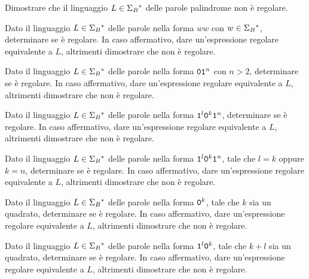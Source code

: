 \begin{Exercise}\label{exe:pump-palindromi}
	Dimostrare che il linguaggio $L\in\Sigma_{B}{}^{\ast}$ delle parole palindrome
	non è regolare.
\end{Exercise}



\begin{Exercise}\label{exe:pump-copie}
	Dato il linguaggio $L\in\Sigma_{B}{}^{\ast}$ delle parole nella forma $ww$ con $w\in\Sigma_{B}{}^{\ast}$, determinare se è
	regolare.
	In  caso affermativo, dare un'espressione regolare equivalente a $L$, altrimenti dimostrare che non è regolare.
\end{Exercise}

\begin{Exercise}\label{exe:pump-011+}
	Dato il linguaggio $L\in\Sigma_{B}{}^{\ast}$ delle parole nella forma $\mathtt{0}\mathtt{1}^{n}$ con $n > 2$, determinare se è
	regolare.
	In  caso affermativo, dare un'espressione regolare equivalente a $L$, altrimenti dimostrare che non è regolare.
\end{Exercise}

\begin{Exercise}\label{exe:pump-1l0k1n}
	Dato il linguaggio $L\in\Sigma_{B}{}^{\ast}$ delle parole nella forma $\mathtt{1}^{l}\mathtt{0}^{k}\mathtt{1}^{n}$, determinare se è
	regolare.
	In  caso affermativo, dare un'espressione regolare equivalente a $L$, altrimenti dimostrare che non è regolare.
\end{Exercise}

\begin{Exercise}\label{exe:pump-1l0k1n-bis}
	Dato il linguaggio $L\in\Sigma_{B}{}^{\ast}$ delle parole nella forma $\mathtt{1}^{l}\mathtt{0}^{k}\mathtt{1}^{n}$, tale che $l=k$ oppure $k=n$,
	determinare se è
	regolare.
	In  caso affermativo, dare un'espressione regolare equivalente a $L$, altrimenti dimostrare che non è regolare.
\end{Exercise}


\begin{Exercise}\label{exe:pump-0square}
	Dato il linguaggio $L\in\Sigma_{B}{}^{\ast}$ delle parole nella forma $\mathtt{0}^{k}$, tale che $k$ sia un quadrato,
	determinare se è
	regolare.
	In  caso affermativo, dare un'espressione regolare equivalente a $L$, altrimenti dimostrare che non è regolare.
\end{Exercise}

\begin{Exercise}\label{exe:pump-01square}
	Dato il linguaggio $L\in\Sigma_{B}{}^{\ast}$ delle parole nella forma $\mathtt{1}^{l}\mathtt{0}^{k}$, tale che $k+l$ sia un quadrato,
	determinare se è
	regolare.
	In  caso affermativo, dare un'espressione regolare equivalente a $L$, altrimenti dimostrare che non è regolare.
\end{Exercise}

